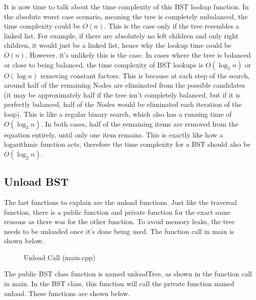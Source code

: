 \documentclass[letterpaper, 10pt]{article}
\begin{document}
\vspace{2em}
\noindent
It is now time to talk about the time complexity of this BST lookup function. In the absolute worst case scenario, meaning the tree is completely unbalanced, the time complexity could be $O(n)$. This is the case only if the tree resembles a linked list. For example, if there are absolutely no left children and only right children, it would just be a linked list, hence why the lookup time could be $O(n)$. However, it's unlikely this is the case. In cases where the tree is balanced or close to being balanced, the time complexity of BST lookups is $O(\log_2 n)$ or $O(\log n)$ removing constant factors. This is because at each step of the search, around half of the remaining Nodes are eliminated from the possible candidates (it may be approximately half if the tree isn't completely balanced, but if it is perfectly balanced, half of the Nodes would be eliminated each iteration of the loop). This is like a regular binary search, which also has a running time of $O(\log_2 n)$. In both cases, half of the remaining items are removed from the equation entirely, until only one item remains. This is exactly like how a logarithmic function acts, therefore the time complexity for a BST should also be $O(\log_2 n)$.

\subsection{Unload BST}
\noindent
The last functions to explain are the unload functions. Just like the traversal function, there is a public function and private function for the exact same reasons as there was for the other function. To avoid memory leaks, the tree needs to be unloaded once it's done being used. The function call in main is shown below.

\vspace{-1em}
\begin{figure}[H]
  \centering
   
  \caption{Unload Call (main.cpp)}
  \label{fig:figure3.12}
\end{figure}

\vspace{-0.5em}
\noindent
The public BST class function is named unloadTree, as shown in the function call in main. In the BST class, this function will call the private function named unload. These functions are shown below.

\vspace{-1em}
\begin{figure}[H]
  \centering
   
  \label{fig:figure3.13-part1}
\end{figure}
\end{document}
